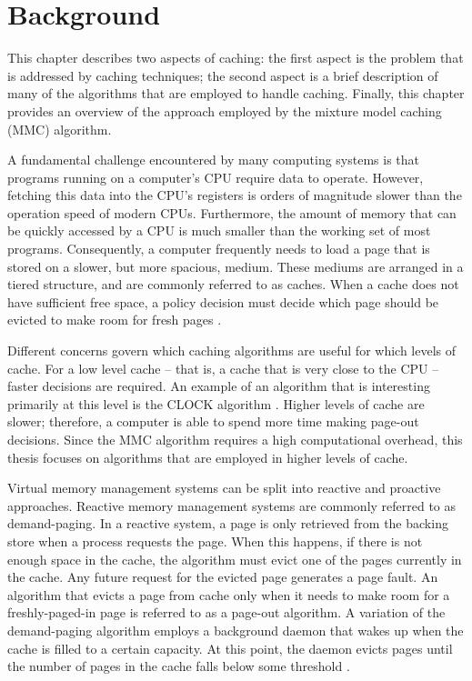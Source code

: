 \chapter{Background}
\label{chapter:background}

  This chapter describes two aspects of caching: the first aspect is the problem
  that is addressed by caching techniques; the second aspect is a brief
  description of many of the algorithms that are employed to handle caching.
  Finally, this chapter provides an overview of the approach employed by the
  mixture model caching (MMC) algorithm.

  A fundamental challenge encountered by many computing systems is that programs
  running on a computer's CPU require data to operate. However, fetching this
  data into the CPU's registers is orders of magnitude slower than the operation
  speed of modern CPUs. Furthermore, the amount of memory that can be quickly
  accessed by a CPU is much smaller than the working set of most programs.
  Consequently, a computer frequently needs to load a page that is stored on
  a slower, but more spacious, medium. These mediums are arranged in a tiered
  structure, and are commonly referred to as caches. When a cache does not have
  sufficient free space, a policy decision must decide which page should be
  evicted to make room for fresh pages \cite{aho1971principles}.

  Different concerns govern which caching algorithms are useful for which levels
  of cache. For a low level cache -- that is, a cache that is very close to the
  CPU -- faster decisions are required. An example of an algorithm that is
  interesting primarily at this level is the CLOCK algorithm
  \cite{tanenbaum2007modern}. Higher levels of cache are slower; therefore, a
  computer is able to spend more time making page-out decisions. Since the MMC
  algorithm requires a high computational overhead, this thesis focuses on
  algorithms that are employed in higher levels of cache.

  Virtual memory management systems can be split into reactive and proactive
  approaches. Reactive memory management systems are commonly referred to as
  demand-paging. In a reactive system, a page is only retrieved from the
  backing store when a process requests the page. When this happens, if there is
  not enough space in the cache, the algorithm must evict one of the pages
  currently in the cache. Any future request for the evicted page generates
  a page fault. An algorithm that evicts a page from cache only when it needs to
  make room for a freshly-paged-in page is referred to as a page-out algorithm.
  A variation of the demand-paging algorithm employs a background daemon that
  wakes up when the cache is filled to a certain capacity. At this point,
  the daemon evicts pages until the number of pages in the cache falls
  below some threshold \cite{mckusick2004design}.

